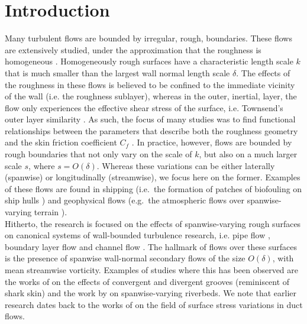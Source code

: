\section{Introduction}\label{sec:spanwiseintro}
Many turbulent flows are bounded by irregular, rough, boundaries. These flows
are extensively studied, under the approximation that the roughness is
homogeneous \citep{Jimenez2004}. Homogeneously rough surfaces have a
characteristic length scale $k$ that is much smaller than the largest wall
normal length scale $\delta$. The effects of the roughness in these flows is
believed to be confined to the immediate vicinity of the wall (i.e. the
roughness sublayer), whereas in the outer, inertial, layer, the flow only
experiences the effective shear stress of the surface, i.e. Townsend's outer
layer similarity \citep{Townsend1976}. As such, the focus of many studies was
to find functional relationships between the parameters that describe both the
roughness geometry and the skin friction coefficient $C_f$ \citep{Flack2010}.
In practice, however, flows are bounded by rough boundaries that not only vary
on the scale of $k$, but also on a much larger scale $s$, where $s=O(\delta)$.
Whereas these variations can be either laterally (spanwise) or longitudinally
(streamwise), we focus here on the former.
Examples of these flows are found in shipping (i.e.~the formation of patches of biofouling on ship hulls \citep{Schultz2007}) and geophysical flows (e.g.~the atmospheric flows over spanwise-varying terrain \citep{Ren2011}).\\
\indent Hitherto, the research is focused on the effects of spanwise-varying rough surfaces on canonical systems of wall-bounded turbulence research, i.e. pipe flow \citep{Koeltzsch2002}, boundary layer flow \citep{Anderson2015} and channel flow \citep{Chung2018}.
The hallmark of flows over these surfaces is the presence of spanwise wall-normal secondary flows of the size  $O(\delta)$, with mean streamwise vorticity. Examples of studies where this has been observed are the works of \citet{Koeltzsch2002} on the effects of convergent and divergent grooves (reminiscent of shark skin) and the work by \cite{Wang2006} on spanwise-varying riverbeds. We note that earlier research dates back to the works of \citet{Hinze1967,Hinze1973} on the field of surface stress variations in duct flows.\\
